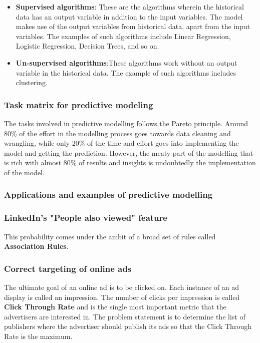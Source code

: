 \documentclass{article}
\numberwithin{equation}{section} %
\begin{document}
\begin{itemize}
	\item \textbf{Supervised algorithms}: These are the algorithms wherein the historical data has an output variable in addition to the input variables. The model makes use of the output variables from historical data, apart from the input variables. The examples of such algorithms include Linear Regression,
	Logistic Regression, Decision Trees, and so on.
	
	\item \textbf{Un-supervised algorithms}:These algorithms work without an
	output variable in the historical data. The example of such algorithms includes clustering.
	 
\end{itemize}


\subsubsection{Task matrix for predictive modeling}

The tasks involved in predictive modelling follows the Pareto principle. Around 80\%
of the effort in the modelling process goes towards data cleaning and wrangling,
while only 20\% of the time and effort goes into implementing the model and getting
the prediction. However, the meaty part of the modelling that is rich with almost
80\% of results and insights is undoubtedly the implementation of the model. \\

\subsubsection*{Applications and examples of predictive modelling}

\subsubsection*{LinkedIn's "People also viewed" feature}

This probability comes under the ambit of a broad set of rules called \textbf{Association Rules}. 

\subsubsection*{Correct targeting of online ads}

The ultimate goal of an online ad is to be clicked on. Each instance of an ad display is called an impression. The number of clicks per impression is called \textbf{Click Through Rate} and is the single most important metric that the advertisers are interested in. The problem statement is to determine the list of publishers where the advertiser should publish its ads so that the Click Through Rate is the maximum. \\
\end{document}
